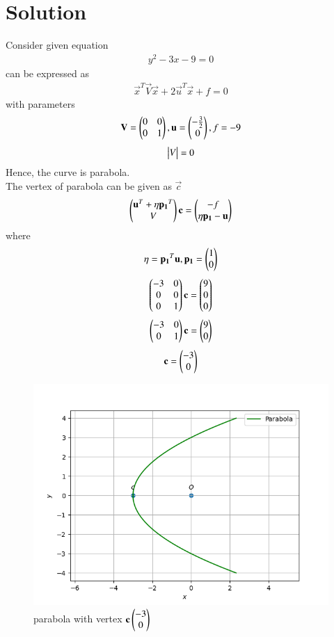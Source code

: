 \documentclass[journal,12pt,twocolumn]{IEEEtran}
\begin{document}
\section{Solution}
Consider given equation
\begin{align}
y^{2}-3x-9=0\label{b1}
\end{align}
\brak{\ref{b1}} can be expressed as
\begin{align}
\vec{x}^{T}\vec{V}\vec{x}+2\vec{u}^{T}\vec{x}+f=0
\end{align}
with parameters
\begin{align}
\mathbf{V}=\begin{pmatrix}0&0\\0&1\end{pmatrix}, \mathbf{u}=\begin{pmatrix}-\frac{3}{2}\\0\end{pmatrix}, f=-9
\end{align}
\begin{align}
\begin{vmatrix}V\end{vmatrix}=0
\end{align}
Hence, the curve is parabola.\\
The vertex of parabola can be given as $\vec{c}$
\begin{align}
    \begin{pmatrix}\mathbf{u}^{T}+\eta \mathbf{p_1}^{T}\\V\end{pmatrix}\mathbf{c}=\begin{pmatrix}-f\\\eta \mathbf{p_1}-\mathbf{u}\end{pmatrix}
\end{align}
where 
\begin{align}
    \eta=\mathbf{p_1}^{T}\mathbf{u}, \mathbf{p_1}=\begin{pmatrix}1\\0\end{pmatrix}
\end{align}
\begin{align}
    \begin{pmatrix}-3&0\\0&0\\0&1\end{pmatrix}\mathbf{c}=\begin{pmatrix}9\\0\\0\end{pmatrix}
\end{align}
\begin{align}
    \begin{pmatrix}-3&0\\0&1\end{pmatrix}\mathbf{c}=\begin{pmatrix}9\\0\end{pmatrix} 
\end{align}
\begin{align}
\mathbf{c}=\begin{pmatrix}-3\\0\end{pmatrix}
\end{align}
\begin{figure}[ht!]
       \centering
        \includegraphics[width =\linewidth]{parabola.png}
        \caption{parabola with vertex $\mathbf{c}\begin{pmatrix}-3\\0\end{pmatrix}$}\label{t1}
\end{figure}
\end{document}
